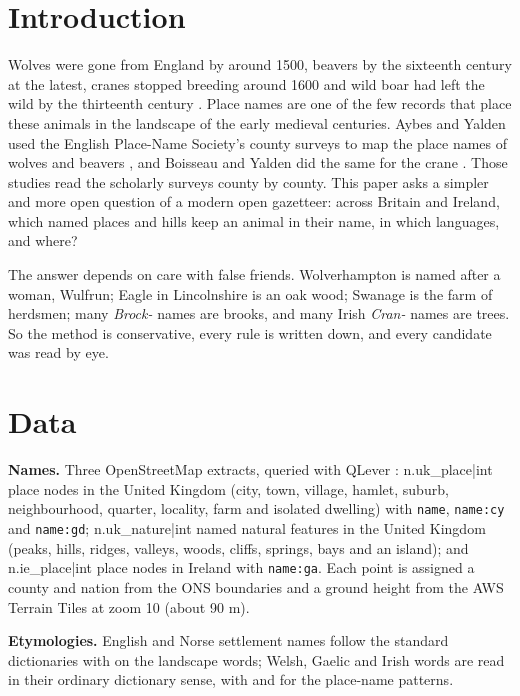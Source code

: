 \documentclass[11pt,a4paper]{article}
\begin{document}
\section{Introduction}
Wolves were gone from England by around 1500, beavers by the sixteenth century at the latest, cranes stopped breeding around 1600 and wild boar had left the wild by the thirteenth century \citep{yalden1999,coles2006,boisseau1998,pluskowski2006}. Place names are one of the few records that place these animals in the landscape of the early medieval centuries. Aybes and Yalden used the English Place-Name Society's county surveys to map the place names of wolves and beavers \citep{aybes1995}, and Boisseau and Yalden did the same for the crane \citep{boisseau1998}. Those studies read the scholarly surveys county by county. This paper asks a simpler and more open question of a modern open gazetteer: across Britain and Ireland, which named places and hills keep an animal in their name, in which languages, and where?

The answer depends on care with false friends. Wolverhampton is named after a woman, Wulfrun; Eagle in Lincolnshire is an oak wood; Swanage is the farm of herdsmen; many \textit{Brock-} names are brooks, and many Irish \textit{Cran-} names are trees. So the method is conservative, every rule is written down, and every candidate was read by eye.

\section{Data}
\textbf{Names.} Three OpenStreetMap extracts, queried with QLever \citep{bast2017}: {{n.uk_place|int}} place nodes in the United Kingdom (city, town, village, hamlet, suburb, neighbourhood, quarter, locality, farm and isolated dwelling) with \texttt{name}, \texttt{name:cy} and \texttt{name:gd}; {{n.uk_nature|int}} named natural features in the United Kingdom (peaks, hills, ridges, valleys, woods, cliffs, springs, bays and an island); and {{n.ie_place|int}} place nodes in Ireland with \texttt{name:ga}. Each point is assigned a county and nation from the ONS boundaries and a ground height from the AWS Terrain Tiles at zoom 10 (about 90 m).

\textbf{Etymologies.} English and Norse settlement names follow the standard dictionaries \citep{mills2011,watts2004,ekwall1960} with \citet{gelling2000} on the landscape words; Welsh, Gaelic and Irish words are read in their ordinary dictionary sense, with \citet{owen2007} and \citet{watson1926} for the place-name patterns.
\end{document}
